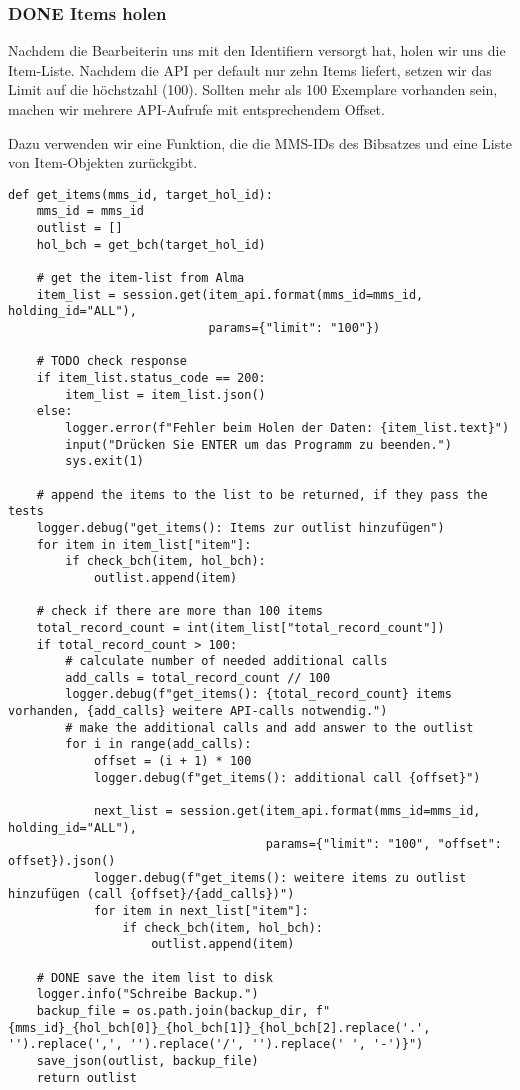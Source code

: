 \documentclass[10pt, a4paper]{scrartcl}
\begin{document}
\subsubsection{{\bfseries\sffamily DONE} Items holen}
\label{sec:orgf3379d2}
Nachdem die Bearbeiterin uns mit den Identifiern versorgt hat, holen wir
uns die Item-Liste. Nachdem die API per default nur zehn Items liefert,
setzen wir das Limit auf die höchstzahl (100). Sollten mehr als 100
Exemplare vorhanden sein, machen wir mehrere API-Aufrufe mit
entsprechendem Offset.

Dazu verwenden wir eine Funktion, die die MMS-IDs des Bibsatzes und eine
Liste von Item-Objekten zurückgibt.

\begin{verbatim}
def get_items(mms_id, target_hol_id):
    mms_id = mms_id
    outlist = []
    hol_bch = get_bch(target_hol_id)

    # get the item-list from Alma
    item_list = session.get(item_api.format(mms_id=mms_id, holding_id="ALL"),
                            params={"limit": "100"})

    # TODO check response
    if item_list.status_code == 200:
        item_list = item_list.json()
    else:
        logger.error(f"Fehler beim Holen der Daten: {item_list.text}")
        input("Drücken Sie ENTER um das Programm zu beenden.")
        sys.exit(1)

    # append the items to the list to be returned, if they pass the tests
    logger.debug("get_items(): Items zur outlist hinzufügen")
    for item in item_list["item"]:
        if check_bch(item, hol_bch):
            outlist.append(item)

    # check if there are more than 100 items
    total_record_count = int(item_list["total_record_count"])
    if total_record_count > 100:
        # calculate number of needed additional calls
        add_calls = total_record_count // 100
        logger.debug(f"get_items(): {total_record_count} items vorhanden, {add_calls} weitere API-calls notwendig.")
        # make the additional calls and add answer to the outlist
        for i in range(add_calls):
            offset = (i + 1) * 100
            logger.debug(f"get_items(): additional call {offset}")

            next_list = session.get(item_api.format(mms_id=mms_id, holding_id="ALL"),
                                    params={"limit": "100", "offset": offset}).json()
            logger.debug(f"get_items(): weitere items zu outlist hinzufügen (call {offset}/{add_calls})")
            for item in next_list["item"]:
                if check_bch(item, hol_bch):
                    outlist.append(item)

    # DONE save the item list to disk
    logger.info("Schreibe Backup.")
    backup_file = os.path.join(backup_dir, f"{mms_id}_{hol_bch[0]}_{hol_bch[1]}_{hol_bch[2].replace('.', '').replace(',', '').replace('/', '').replace(' ', '-')}")
    save_json(outlist, backup_file)
    return outlist
\end{verbatim}
\end{document}
